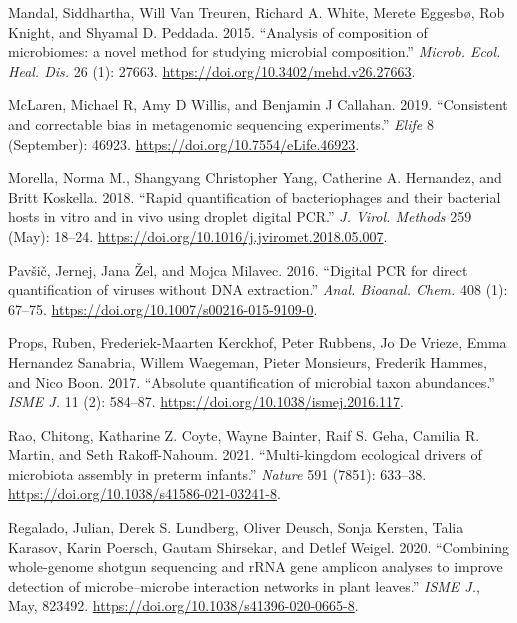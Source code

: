 \documentclass[
]{article}
\newlength{\cslhangindent}
\newlength{\cslentryspacingunit} %
\newenvironment{CSLReferences}[2] %
 {%
  \setlength{\parindent}{0pt}
  \ifodd #1
  \let\oldpar\par
  \def\par{\hangindent=\cslhangindent\oldpar}
  \fi
  \setlength{\parskip}{#2\cslentryspacingunit}
 }%
 {}
\begin{document}
\begin{CSLReferences}{1}{0}
\leavevmode{}%
Mandal, Siddhartha, Will Van Treuren, Richard A. White, Merete Eggesbø, Rob Knight, and Shyamal D. Peddada. 2015. {``{Analysis of composition of microbiomes: a novel method for studying microbial composition}.''} \emph{Microb. Ecol. Heal. Dis.} 26 (1): 27663. \url{https://doi.org/10.3402/mehd.v26.27663}.

\leavevmode{}%
McLaren, Michael R, Amy D Willis, and Benjamin J Callahan. 2019. {``{Consistent and correctable bias in metagenomic sequencing experiments}.''} \emph{Elife} 8 (September): 46923. \url{https://doi.org/10.7554/eLife.46923}.

\leavevmode{}%
Morella, Norma M., Shangyang Christopher Yang, Catherine A. Hernandez, and Britt Koskella. 2018. {``{Rapid quantification of bacteriophages and their bacterial hosts in vitro and in vivo using droplet digital PCR}.''} \emph{J. Virol. Methods} 259 (May): 18--24. \url{https://doi.org/10.1016/j.jviromet.2018.05.007}.

\leavevmode{}%
Pavšič, Jernej, Jana Žel, and Mojca Milavec. 2016. {``{Digital PCR for direct quantification of viruses without DNA extraction}.''} \emph{Anal. Bioanal. Chem.} 408 (1): 67--75. \url{https://doi.org/10.1007/s00216-015-9109-0}.

\leavevmode{}%
Props, Ruben, Frederiek-Maarten Kerckhof, Peter Rubbens, Jo De Vrieze, Emma Hernandez Sanabria, Willem Waegeman, Pieter Monsieurs, Frederik Hammes, and Nico Boon. 2017. {``{Absolute quantification of microbial taxon abundances}.''} \emph{ISME J.} 11 (2): 584--87. \url{https://doi.org/10.1038/ismej.2016.117}.

\leavevmode{}%
Rao, Chitong, Katharine Z. Coyte, Wayne Bainter, Raif S. Geha, Camilia R. Martin, and Seth Rakoff-Nahoum. 2021. {``{Multi-kingdom ecological drivers of microbiota assembly in preterm infants}.''} \emph{Nature} 591 (7851): 633--38. \url{https://doi.org/10.1038/s41586-021-03241-8}.

\leavevmode{}%
Regalado, Julian, Derek S. Lundberg, Oliver Deusch, Sonja Kersten, Talia Karasov, Karin Poersch, Gautam Shirsekar, and Detlef Weigel. 2020. {``{Combining whole-genome shotgun sequencing and rRNA gene amplicon analyses to improve detection of microbe--microbe interaction networks in plant leaves}.''} \emph{ISME J.}, May, 823492. \url{https://doi.org/10.1038/s41396-020-0665-8}.


\end{CSLReferences}
\end{document}
